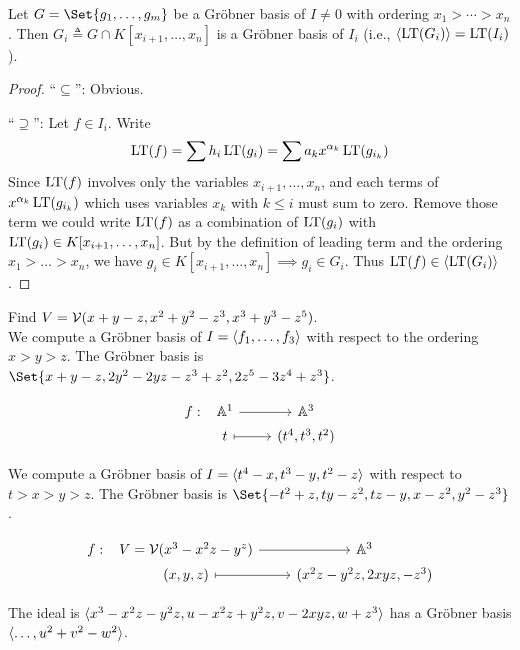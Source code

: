 \begin{theorem}
  Let $G = \Set{g_1, \dots, g_m}$ be a Gr\"obner basis of $I \neq 0$ with ordering
  $x_1 > \dotsm > x_n$. Then $G_i \triangleq G \cap K[x_{i+1}, \dots, x_n]$
  is a Gr\"obner basis of $I_i$ (i.e., $\langle \operatorname{LT}(G_i) \rangle = \operatorname{LT}(I_i)$).
  \begin{proof}
    ``$\subseteq$'': Obvious.

    ``$\supseteq$'': Let $f \in I_i$. Write
    \[ \operatorname{LT}(f) = \sum h_i \operatorname{LT}(g_i) = \sum a_k x^{\alpha_k} \operatorname{LT}(g_{i_k}) \]
    Since $\operatorname{LT}(f)$ involves only the variables $x_{i+1}, \dots, x_n$,
    and each terms of $x^{\alpha_k} \operatorname{LT}(g_{i_k})$ which uses variables
    $x_{k}$ with $k \leq i$ must sum to zero. Remove those term
    we could write $\operatorname{LT}(f)$ as a combination of $\operatorname{LT}(g_i)$
    with $\operatorname{LT}(g_i) \in K[x_{i+1}, \dots, x_n]$.
    But by the definition of leading term and the ordering $x_1 > \dots > x_n$,
    we have $g_i \in K[x_{i+1}, \dots, x_n] \implies g_i \in G_i$.
    Thus $\operatorname{LT}(f) \in \langle\operatorname{LT}(G_i)\rangle$.
  \end{proof}
\end{theorem}

\begin{example}
  Find $V = \mathcal{V}(x+y-z, x^2+y^2-z^3, x^3+y^3-z^5)$. \\
  We compute a Gr\"obner basis of $I = \langle f_1, \dots, f_3 \rangle$ with respect
  to the ordering $x > y > z$.
  The Gr\"obner basis is $\Set{x+y-z, 2y^2-2yz-z^3+z^2, 2z^5-3z^4+z^3}$.
\end{example}

\begin{example}
  \[
    \begin{tikzcd}[column sep=0.8cm,row sep=0ex]
      f: &[-0.7cm] \Ab^1 \arrow[r] & \Ab^3 \\
      & t \arrow[r, mapsto] & (t^4, t^3, t^2)
    \end{tikzcd}
  \]

  We compute a Gr\"obner basis of $I = \langle t^4 - x, t^3 - y, t^2 - z \rangle$ with
  respect to $t > x > y > z$. The Gr\"obner basis is
  $\Set{-t^2+z, ty-z^2, tz-y, x-z^2, y^2-z^3}$.
\end{example}

\begin{example}
  \[
    \begin{tikzcd}[column sep=0.8cm,row sep=0ex]
      f: &[-0.7cm] V = \Vc(x^3 - x^2z - y^z) \arrow[r] & \Ab^3 \\
      & (x, y, z) \arrow[r, mapsto] & (x^2 z - y^2 z, 2xyz, -z^3)
    \end{tikzcd}
  \]

  The ideal is $\langle x^3 - x^2 z - y^2 z, u - x^2 z + y^2 z, v - 2 x y z, w + z^3 \rangle$
    has a Gr\"obner basis $\langle \dots, u^2 + v^2 - w^2 \rangle$.
\end{example}

